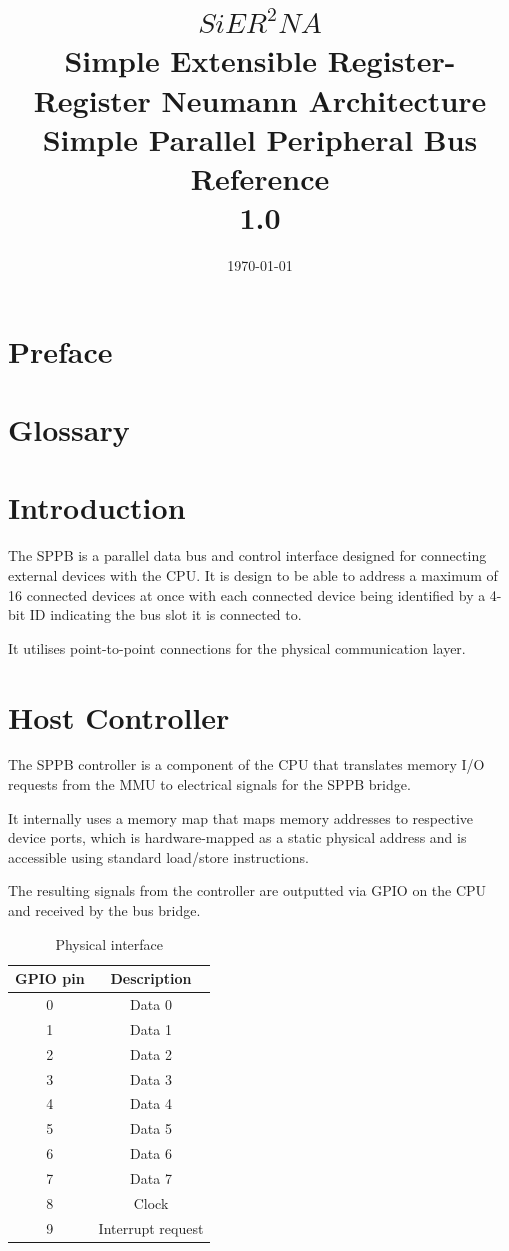 \documentclass[a4paper,10pt]{article}
\title{
	$SiER^2NA$ \\
	\small Simple Extensible Register-Register Neumann Architecture \\
	\large Simple Parallel Peripheral Bus Reference \\
	\large 1.0
}
\date{\today}
\begin{document}
\maketitle
\tableofcontents

\section{Preface}

\section{Glossary}
\printglossaries

\section{Introduction} \label{SPPB}
The \gls{SPPB} is a parallel data bus and control interface designed for connecting external devices with the CPU. It is design to be able to address a maximum of 16 connected devices at once with each connected device being identified by a 4-bit ID indicating the bus slot it is connected to.

It utilises point-to-point connections for the physical communication layer.

\section{Host Controller} \label{SPPBC}
The \acrshort{SPPB} controller is a component of the CPU that translates memory I/O requests from the MMU to electrical signals for the \acrshort{SPPB} bridge.

It internally uses a memory map that maps memory addresses to respective device ports, which is hardware-mapped as a static physical address and is accessible using standard load/store instructions.

The resulting signals from the controller are outputted via GPIO on the CPU and received by the bus bridge.

\begin{table}[H]
	\centering
	\caption{Physical interface}
	{
		\begin{tabular}{|c|c|}
\hline
GPIO pin & Description \\
\hline
0 & Data 0 \\
\hline
1 & Data 1 \\
\hline
2 & Data 2 \\
\hline
3 & Data 3 \\
\hline
4 & Data 4 \\
\hline
5 & Data 5 \\
\hline
6 & Data 6 \\
\hline
7 & Data 7 \\
\hline
8 & Clock \\
\hline
9 & Interrupt request \\
\hline
		\end{tabular}
	}
\end{table}
\end{document}
